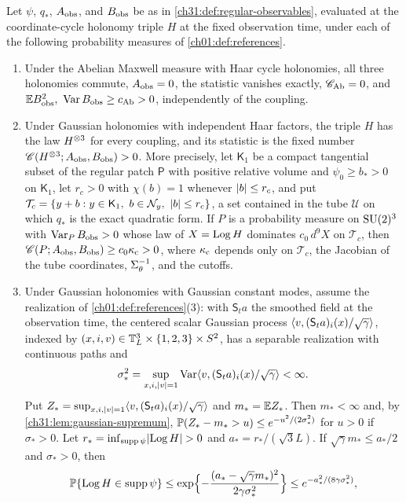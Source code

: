 \begin{lemma}\label{ch31:lem:reference-comparisons}
Let $\psi$, $q_*$, $A_{\mathrm{obs}}$, and $B_{\mathrm{obs}}$ be as in \cref{ch31:def:regular-observables}, evaluated at the coordinate-cycle holonomy triple $H$ at the fixed observation time, under each of the following probability measures of \cref{ch01:def:references}.
\begin{enumerate}
\item Under the Abelian Maxwell measure with Haar cycle holonomies, all three holonomies commute, $A_{\mathrm{obs}}=0$, the statistic vanishes exactly, $\mathscr C_{\rm Ab}=0$, and $\E\ObsB^2,\ \Var\ObsB\ge c_{\rm Ab}>0$, independently of the coupling.
\item Under Gaussian holonomies with independent Haar factors, the triple $H$ has the law $H^{\otimes3}$ for every coupling, and its statistic is the fixed number $\mathscr C(H^{\otimes3};A_{\mathrm{obs}},B_{\mathrm{obs}})>0$. More precisely, let $\mathsf K_1$ be a compact tangential subset of the regular patch $\mathsf P$ with positive relative volume and $\psi_0\ge b_*>0$ on $\mathsf K_1$, let $r_c>0$ with $\chi(b)=1$ whenever $\lvert b\rvert\le r_c$, and put $\mathcal T_c=\{y+b:y\in\mathsf K_1,\ b\in\NormalFiber y,\ \abs b\le r_c\}$, a set contained in the tube $\mathcal U$ on which $q_*$ is the exact quadratic form. If $P$ is a probability measure on $\mathrm{SU}(2)^3$ with $\operatorname{Var}_PB_{\mathrm{obs}}>0$ whose law of $X=\operatorname{Log} H$ dominates $c_0\,d^9X$ on $\mathcal T_c$, then $\mathscr C(P;A_{\mathrm{obs}},B_{\mathrm{obs}})\ge c_0\kappa_{\rm c}>0$, where $\kappa_{\rm c}$ depends only on $\mathcal T_c$, the Jacobian of the tube coordinates, $\Sigma_\theta^{-1}$, and the cutoffs.
\item Under Gaussian holonomies with Gaussian constant modes, assume the realization of \cref{ch01:def:references}(3): with $\mathsf S_ta$ the smoothed field at the observation time, the centered scalar Gaussian process $\langle v,(\mathsf S_ta)_i(x)/\sqrt\gamma\rangle$, indexed by $(x,i,v)\in\mathbb T_L^3\times\{1,2,3\}\times S^2$, has a separable realization with continuous paths and
\[
 \sigma_*^2=\sup_{x,i,\lvert v\rvert=1}\operatorname{Var}\langle v,(\mathsf S_ta)_i(x)/\sqrt\gamma\rangle<\infty.
\]
Put $Z_*=\sup_{x,i,\lvert v\rvert=1}\langle v,(\mathsf S_ta)_i(x)/\sqrt\gamma\rangle$ and $m_*=\mathbb E Z_*$. Then $m_*<\infty$ and, by \cref{ch31:lem:gaussian-supremum}, $\mathbb P(Z_*-m_*>u)\le e^{-u^2/(2\sigma_*^2)}$ for $u>0$ if $\sigma_*>0$. Let $r_*=\inf_{\operatorname{supp}\psi}\lvert \operatorname{Log} H\rvert>0$ and $a_*=r_*/(\sqrt3L)$. If $\sqrt\gamma m_*\le a_*/2$ and $\sigma_*>0$, then
\[
 \mathbb P\{\operatorname{Log} H\in\operatorname{supp}\psi\}\le\exp\Bigl\{-\frac{(a_*-\sqrt\gamma m_*)^2}{2\gamma\sigma_*^2}\Bigr\}\le e^{-a_*^2/(8\gamma\sigma_*^2)},
\]
\end{enumerate}
\end{lemma}
